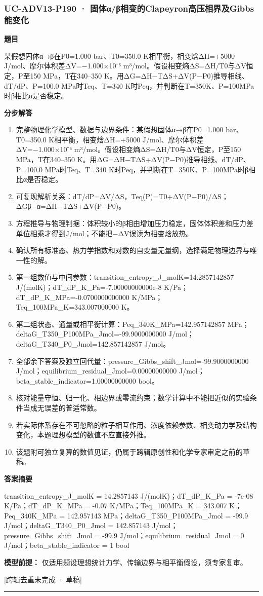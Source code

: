 \documentclass[UTF8,11pt,a4paper]{ctexart}
\begin{document}
\subsubsection*{UC-ADV13-P190 · 固体α/β相变的Clapeyron高压相界及Gibbs能变化}
\noindent\textbf{题目}\par
某假想固体α→β在P0=1.000 bar、T0=350.0 K相平衡，相变焓ΔH=+5000 J/mol、摩尔体积差ΔV=−1.000×10⁻⁶ m³/mol。假设相变熵ΔS=ΔH/T0与ΔV恒定，P至150 MPa，T在340–350 K。用ΔG=ΔH−TΔS+ΔV(P−P0)推导相线、dT/dP、P=100.0 MPa时Teq、T=340 K时Peq，并判断在T=350K、P=100MPa时β相比α是否稳定。\par
\medskip\noindent\textbf{分步解答}
\begin{enumerate}
\item 完整物理化学模型、数据与边界条件：某假想固体α→β在P0=1.000 bar、T0=350.0 K相平衡，相变焓ΔH=+5000 J/mol、摩尔体积差ΔV=−1.000×10⁻⁶ m³/mol。假设相变熵ΔS=ΔH/T0与ΔV恒定，P至150 MPa，T在340–350 K。用ΔG=ΔH−TΔS+ΔV(P−P0)推导相线、dT/dP、P=100.0 MPa时Teq、T=340 K时Peq，并判断在T=350K、P=100MPa时β相比α是否稳定。
\item 可复现解析关系：dT/dP=ΔV/ΔS，Teq(P)=T0+ΔV(P−P0)/ΔS；ΔGβ−α=ΔH−TΔS+ΔV(P−P0)。
\item 方程推导与物理判据：体积较小的β相由增加压力稳定，固体体积差和压力差单位相乘才得到J/mol；不能把−ΔV误读为相变焓放热。
\item 确认所有标准态、热力学指数和对数的自变量无量纲，选择满足物理边界与唯一性的解。
\item 第一组数值与中间参数：transition\_entropy\_J\_molK=14.2857142857 J/(molK)；dT\_dP\_K\_Pa=-7.00000000000e-8 K/Pa；dT\_dP\_K\_MPa=-0.0700000000000 K/MPa；Teq\_100MPa\_K=343.007000000 K。
\item 第二组状态、通量或相平衡计算：Peq\_340K\_MPa=142.957142857 MPa；deltaG\_T350\_P100MPa\_Jmol=-99.9000000000 J/mol；deltaG\_T340\_P0\_Jmol=142.857142857 J/mol。
\item 全部余下答案及独立回代量：pressure\_Gibbs\_shift\_Jmol=-99.9000000000 J/mol；equilibrium\_residual\_Jmol=0.00000000000 J/mol；beta\_stable\_indicator=1.00000000000 bool。
\item 核对能量守恒、归一化、相边界或零流约束；数学计算中不能把近似的实验条件当成无误差的普适常数。
\item 若实际体系存在不可忽略的粒子相互作用、浓度依赖参数、相变动力学及结构变化，本题理想模型的数值不应直接外推。
\item 该题附可独立复算的数值见证，仍属于跨辑原创性和化学专家审定之前的草稿。
\end{enumerate}
\noindent\textbf{答案摘要}\par
transition\_entropy\_J\_molK = 14.2857143 J/(molK)；dT\_dP\_K\_Pa = -7e-08 K/Pa；dT\_dP\_K\_MPa = -0.07 K/MPa；Teq\_100MPa\_K = 343.007 K；Peq\_340K\_MPa = 142.957143 MPa；deltaG\_T350\_P100MPa\_Jmol = -99.9 J/mol；deltaG\_T340\_P0\_Jmol = 142.857143 J/mol；pressure\_Gibbs\_shift\_Jmol = -99.9 J/mol；equilibrium\_residual\_Jmol = 0 J/mol；beta\_stable\_indicator = 1 bool\par
\noindent\textbf{模型前提：}
仅适用题设理想统计力学、传输边界与相平衡假设，须专家复审。\par
\noindent\textcolor{red!65!black}{[跨辑去重未完成 · 草稿]} \par
\medskip\hrule\medskip
{}
\end{document}
